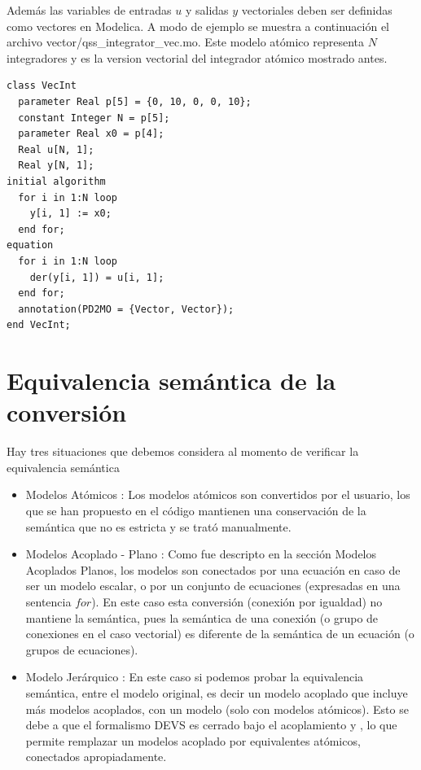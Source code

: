 Además las variables de entradas $u$ y salidas $y$ vectoriales deben ser definidas como vectores en Modelica. A modo de ejemplo se muestra a continuación el archivo vector/qss\_integrator\_vec.mo. Este modelo atómico representa $N$ integradores y es la version vectorial del integrador atómico mostrado antes.

\begin{verbatim}
class VecInt
  parameter Real p[5] = {0, 10, 0, 0, 10};
  constant Integer N = p[5];
  parameter Real x0 = p[4];
  Real u[N, 1];
  Real y[N, 1];
initial algorithm
  for i in 1:N loop
    y[i, 1] := x0;
  end for;
equation
  for i in 1:N loop
    der(y[i, 1]) = u[i, 1];
  end for;
  annotation(PD2MO = {Vector, Vector});
end VecInt;
\end{verbatim}


\section{Equivalencia semántica de la conversión}
Hay tres situaciones que debemos considera al momento de verificar la equivalencia semántica
\begin{itemize}
\item Modelos Atómicos : Los modelos atómicos son convertidos por el usuario, los que se han propuesto en el código mantienen una conservación de la semántica que no es estricta y se trató manualmente. 
\item Modelos Acoplado - Plano : Como fue descripto en la sección Modelos Acoplados Planos, los modelos son conectados por una ecuación en caso de ser un modelo escalar, o por un conjunto de ecuaciones (expresadas en una sentencia $for$). En este caso esta conversión (conexión por igualdad) no mantiene la semántica, pues la semántica de una conexión (o grupo de conexiones en el caso vectorial) es diferente de la semántica de un ecuación (o grupos de ecuaciones).

\item Modelo Jerárquico : En este caso si podemos probar la equivalencia semántica, entre el modelo original, es decir un modelo acoplado que incluye más modelos acoplados, con un modelo  (solo con modelos atómicos). Esto se debe a que el formalismo DEVS es cerrado bajo el acoplamiento \cite{Zeigler:2000:TMS:580780} y \cite{zeigler1984multifacetted}, lo que permite remplazar un modelos acoplado por equivalentes atómicos, conectados apropiadamente.
\end{itemize}
